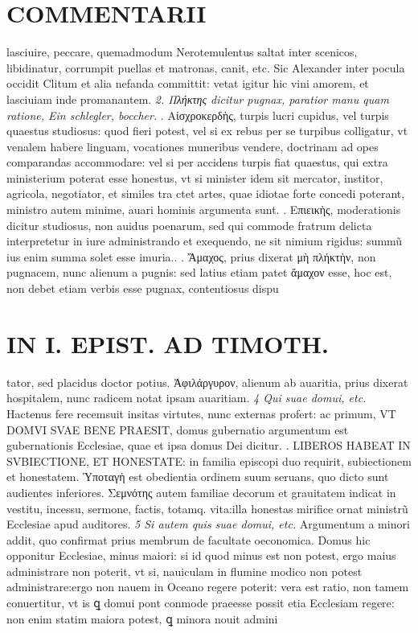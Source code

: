 \documentclass{article}
\begin{document}
\begin{pages}
\section*{COMMENTARII }
\marginpar{[ p.66 ]}\pstart lasciuire, peccare, quemadmodum Nerotemulentus saltat inter scenicos, libidinatur, corrumpit puellas et matronas, canit, etc. Sic Alexander inter pocula occidit Clitum et alia nefanda committit: vetat igitur hic vini amorem, et lasciuiam inde promanantem.  \pend
\textit{2. Πλήκτης dicitur pugnax, paratior manu quam ratione, Ein schlegler, boccher. }. Αἰσχροκερδὴς, turpis lucri cupidus, vel turpis quaestus studiosus: quod fieri potest, vel si ex rebus per se turpibus colligatur, vt venalem habere linguam, vocationes muneribus vendere, doctrinam ad opes comparandas accommodare: vel si per accidens turpis fiat quaestus, qui extra ministerium poterat esse honestus, vt si minister idem sit mercator, institor, agricola, negotiator, et similes tra ctet artes, quae idiotae forte concedi poterant, ministro autem minime, auari hominis argumenta sunt.  \pend{}. Επιεικὴς, moderationis dicitur studiosus, non auidus poenarum, sed qui commode fratrum delicta interpretetur in iure administrando et exequendo, ne sit nimium rigidus: summũ ius enim summa solet esse imuria..  \pend{}. Ἄμαχος, prius dixerat μὴ πλήκτὴν, non pugnacem, nunc alienum a pugnis: sed latius etiam patet ἄμαχον esse, hoc est, non debet etiam verbis esse pugnax, contentiosus dispu\pend
\section*{IN I. EPIST. AD TIMOTH. }
\marginpar{[ p.67 ]}\pstart tator, sed placidus doctor potius.  \pend{} Ἀφιλάργυρον, alienum ab auaritia, prius dixerat hospitalem, nunc radicem notat ipsam auaritiam.  \pend
\textit{4 Qui suae domui, etc. }\pstart Hactenus fere recemsuit insitas virtutes, nunc externas profert: ac primum, VT DOMVI SVAE BENE PRAESIT, domus gubernatio argumentum est gubernationis Ecclesiae, quae et ipsa domus Dei dicitur.  \pend{}. LIBEROS HABEAT IN SVBIECTIONE, ET HONESTATE: in familia episcopi duo requirit, subiectionem et honestatem. Ὑποταγὴ est obedientia ordinem suum seruans, quo dicto sunt audientes inferiores. Σεμνότης autem familiae decorum et grauitatem indicat in vestitu, incessu, sermone, factis, totamq. vita:illa honestas mirifice ornat ministrũ Ecclesiae apud auditores.  \pend
\textit{5 Si autem quis suae domui, etc. }\pstart Argumentum a minori addit, quo confirmat prius membrum de facultate oeconomica. Domus hic opponitur Ecclesiae, minus maiori: si id quod minus est non potest, ergo maius administrare non poterit, vt si, nauiculam in flumine modico non potest administrare:ergo non nauem in Oceano regere poterit: vera est ratio, non tamem conuertitur, vt is ꝗ domui pont conmode praeesse possit etia Ecclesiam regere: non enim statim maiora potest, ꝗ minora nouit admini  \pend

\end{pages}
\end{document}
